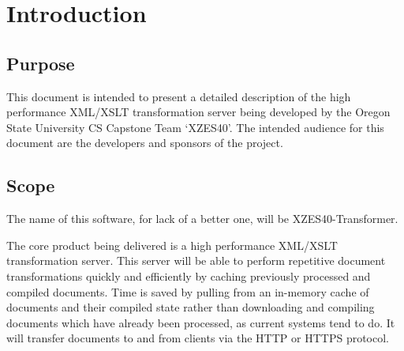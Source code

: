 \section{Introduction}

\subsection{Purpose}

This document is intended to present a detailed description of the high performance XML/XSLT transformation server being developed by the Oregon State University CS Capstone Team `XZES40'.
The intended audience for this document are the developers and sponsors of the project.


\subsection{Scope}

The name of this software, for lack of a better one, will be XZES40-Transformer.

The core product being delivered is a high performance XML/XSLT transformation server.
This server will be able to perform repetitive document transformations quickly and efficiently by caching previously processed and compiled documents.
Time is saved by pulling from an in-memory cache of documents and their compiled state rather than downloading and compiling documents which have already been processed, as current systems tend to do.
It will transfer documents to and from clients via the HTTP or HTTPS protocol.

